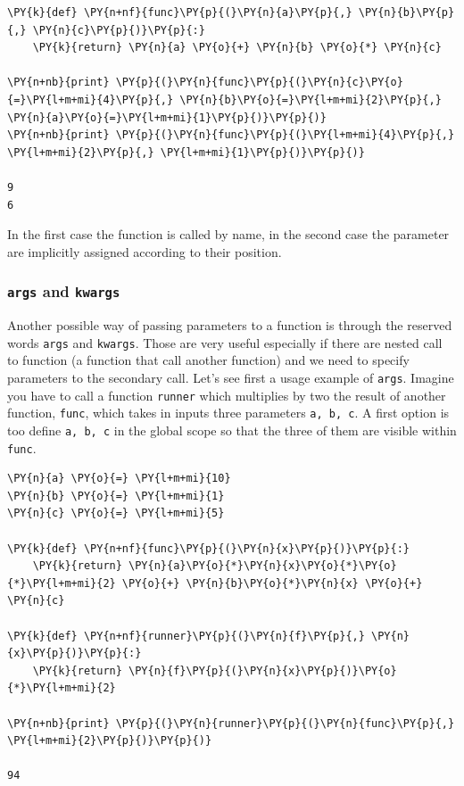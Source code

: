 \begin{tcolorbox}[breakable, size=fbox, boxrule=1pt, pad at break*=1mm,colback=cellbackground, colframe=cellborder]
\begin{Verbatim}[commandchars=\\\{\}]
\PY{k}{def} \PY{n+nf}{func}\PY{p}{(}\PY{n}{a}\PY{p}{,} \PY{n}{b}\PY{p}{,} \PY{n}{c}\PY{p}{)}\PY{p}{:}
    \PY{k}{return} \PY{n}{a} \PY{o}{+} \PY{n}{b} \PY{o}{*} \PY{n}{c}

\PY{n+nb}{print} \PY{p}{(}\PY{n}{func}\PY{p}{(}\PY{n}{c}\PY{o}{=}\PY{l+m+mi}{4}\PY{p}{,} \PY{n}{b}\PY{o}{=}\PY{l+m+mi}{2}\PY{p}{,} \PY{n}{a}\PY{o}{=}\PY{l+m+mi}{1}\PY{p}{)}\PY{p}{)}
\PY{n+nb}{print} \PY{p}{(}\PY{n}{func}\PY{p}{(}\PY{l+m+mi}{4}\PY{p}{,} \PY{l+m+mi}{2}\PY{p}{,} \PY{l+m+mi}{1}\PY{p}{)}\PY{p}{)}

9
6
\end{Verbatim}
\end{tcolorbox}

In the first case the function is called by name, in the second case the parameter are implicitly assigned according to their position.

\subsubsection{\texttt{args} and \texttt{kwargs}}
Another possible way of passing parameters to a function is through the reserved words \texttt{args} and \texttt{kwargs}. Those are very useful especially if there are nested call to function (a function that call another function) and we need to specify parameters to the secondary call.
Let's see first a usage example of \texttt{args}.
Imagine you have to call a function \texttt{runner} which multiplies by two the result of another function, \texttt{func}, which takes in inputs three parameters \texttt{a, b, c}.
A first option is too define \texttt{a, b, c} in the global scope so that the three of them are visible within \texttt{func}.
\begin{tcolorbox}[breakable, size=fbox, boxrule=1pt, pad at break*=1mm,colback=cellbackground, colframe=cellborder]
\begin{Verbatim}[commandchars=\\\{\}]
\PY{n}{a} \PY{o}{=} \PY{l+m+mi}{10}
\PY{n}{b} \PY{o}{=} \PY{l+m+mi}{1}
\PY{n}{c} \PY{o}{=} \PY{l+m+mi}{5}
 		
\PY{k}{def} \PY{n+nf}{func}\PY{p}{(}\PY{n}{x}\PY{p}{)}\PY{p}{:}
    \PY{k}{return} \PY{n}{a}\PY{o}{*}\PY{n}{x}\PY{o}{*}\PY{o}{*}\PY{l+m+mi}{2} \PY{o}{+} \PY{n}{b}\PY{o}{*}\PY{n}{x} \PY{o}{+} \PY{n}{c}
 		
\PY{k}{def} \PY{n+nf}{runner}\PY{p}{(}\PY{n}{f}\PY{p}{,} \PY{n}{x}\PY{p}{)}\PY{p}{:}
    \PY{k}{return} \PY{n}{f}\PY{p}{(}\PY{n}{x}\PY{p}{)}\PY{o}{*}\PY{l+m+mi}{2}
 		
\PY{n+nb}{print} \PY{p}{(}\PY{n}{runner}\PY{p}{(}\PY{n}{func}\PY{p}{,} \PY{l+m+mi}{2}\PY{p}{)}\PY{p}{)}
 	
94
\end{Verbatim}
\end{tcolorbox}

